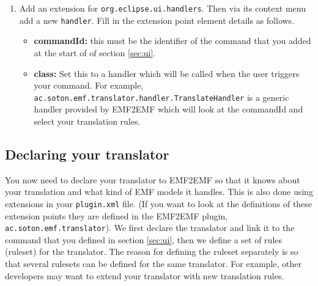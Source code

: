 \begin{enumerate}
	\item
	Add an extension for \texttt{org.eclipse.ui.handlers}. Then via its context menu add a new \texttt{handler}. Fill in the extension point element details as follows.
	\begin{itemize}
		\item \textbf{commandId:} this must be the identifier of the command that you added at the start of of section \ref{sec:ui}.
		\item \textbf{class:} Set this to a handler which will be called when the user triggers your command.  For example, \texttt{ac.soton.emf.translator.handler.TranslateHandler} is a generic handler provided by EMF2EMF which will look at the commandId and select your translation rules. 
	\end{itemize}
	
\end{enumerate}


\subsection{Declaring your translator}
\label{sec:translatorDecln}

You now need to declare your translator to EMF2EMF so that it knows about your translation and what kind of EMF models it handles. This is also done using extensions in your \texttt{plugin.xml} file. (If you want to look at the definitions of these extension points they are defined in the EMF2EMF plugin, \texttt{ac.soton.emf.translator}).
We first declare the translator and link it to the command that you defined in section \ref{sec:ui}, then we define a set of rules (ruleset) for the translator. The reason for defining the ruleset separately is so that several rulesets can be defined for the same translator. For example, other developers may want to extend your translator with new translation rules.

